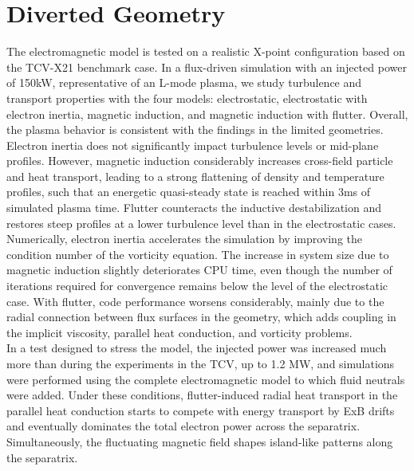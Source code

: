 \chapter{Diverted Geometry}
\label{chap:TCV}

\begin{chaptersummarybox}
	The electromagnetic model is tested on a realistic X-point configuration based on the TCV-X21 benchmark case. In a flux-driven simulation with an injected power of 150kW, representative of an L-mode plasma, we study turbulence and transport properties with the four models: electrostatic, electrostatic with electron inertia, magnetic induction, and magnetic induction with flutter. Overall, the plasma behavior is consistent with the findings in the limited geometries. Electron inertia does not significantly impact turbulence levels or mid-plane profiles. However, magnetic induction considerably increases cross-field particle and heat transport, leading to a strong flattening of density and temperature profiles, such that an energetic quasi-steady state is reached within 3ms of simulated plasma time. Flutter counteracts the inductive destabilization and restores steep profiles at a lower turbulence level than in the electrostatic cases. \\
	Numerically, electron inertia accelerates the simulation by improving the condition number of the vorticity equation. The increase in system size due to magnetic induction slightly deteriorates CPU time, even though the number of iterations required for convergence remains below the level of the electrostatic case. With flutter, code performance worsens considerably, mainly due to the radial connection between flux surfaces in the geometry, which adds coupling in the implicit viscosity, parallel heat conduction, and vorticity problems. \\
	In a test designed to stress the model, the injected power was increased much more than during the experiments in the TCV, up to 1.2 MW, and simulations were performed using the complete electromagnetic model to which fluid neutrals were added. Under these conditions, flutter-induced radial heat transport in the parallel heat conduction starts to compete with energy transport by ExB drifts and eventually dominates the total electron power across the separatrix. Simultaneously, the fluctuating magnetic field shapes island-like patterns along the separatrix.
\end{chaptersummarybox}

\newpage


